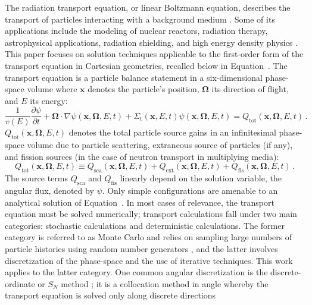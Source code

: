 \documentclass[xchauthor,chkrefs,fixeqskip,GCNS,amsmath,amsthm]{yjcphg}
\theoremstyle{remark}
\newcommand{\di}{\bm{\Omega}}
\begin{document}
The radiation transport equation, or linear Boltzmann equation,
describes the transport of particles interacting with a background
medium \cite{glasstone}. Some of its applications include the
modeling of nuclear reactors, radiation therapy, astrophysical
applications, radiation shielding, and high energy density physics
\cite{glasstone,radiotherapy,astrophysics_textbook,lewis,laser_plasmas}.
This paper focuses on solution techniques applicable to the first-order
form of the transport equation in Cartesian geometries, recalled below
in Equation~. The transport equation is a
particle balance statement in a six-dimensional phase-space volume where
$\mathbf{x}$ denotes the particle's position, $\di$ its direction of
flight, and $E$ its energy:
%
\begin{equation}
\label{eq:transport_scalar}
\frac{1}{v(E)}\frac{\partial\psi}{\partial t} + \di\cdot\nabla
\psi(\mathbf{x},\di,E,t)+ \Sigma_{\text{t}}(\mathbf{x},E,t)\psi(
\mathbf{x},\di,E,t)= Q_{\text{tot}}(\mathbf{x},\di,E,t)\,.
\end{equation}
%
$Q_{\text{tot}}(\mathbf{x},\di,E,t)$ denotes the total particle
source gains in an infinitesimal phase-space volume due to particle
scattering, extraneous source of particles (if any), and fission sources
(in the case of neutron transport in multiplying media):
%
\begin{equation}
Q_{\text{tot}}(\mathbf{x},\di,E,t)\equiv Q_{\text{sca}}(
\mathbf{x},\di,E,t)+ Q_{\text{ext}}(\mathbf{x},\di,E,t)+ Q_{
\text{fis}}(\mathbf{x},\di,E,t)\,.
\end{equation}
%
The source terms $Q_{\text{sca}}$ and $Q_{\text{fis}}$ linearly
depend on the solution variable, the angular flux, denoted by
$\psi$. Only simple configurations are amenable to an analytical
solution of Equation~. In most cases of
relevance, the transport equation must be solved numerically; transport
calculations fall under two main categories: stochastic calculations and
deterministic calculations. The former category is referred to as Monte
Carlo and relies on sampling large numbers of particle histories using
random number generators \cite{glasstone}, and the latter involves
discretization of the phase-space and the use of iterative techniques.
This work applies to the latter category. One common angular
discretization is the discrete-ordinate or $S_{N}$ method
\cite{glasstone,lewis,duderstadt}; it is a collocation method in angle
whereby the transport equation is solved only along discrete directions
\end{document}
